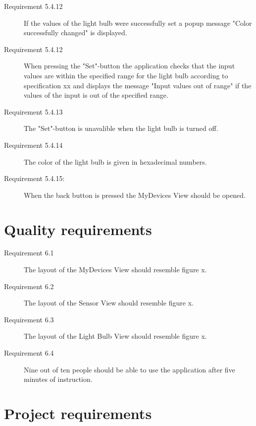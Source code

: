 \documentclass[a4paper]{article}
\begin{document}
\begin{description}
\item[Requirement 5.4.12] If the values of the light bulb were successfully set a popup message "Color successfully changed" is displayed.

\item[Requirement 5.4.12] When pressing the "Set"-button the application checks that the input values are within the specified range for the light bulb according to specification xx and displays the message "Input values out of range" if the values of the input is out of the specified range.

\item[Requirement 5.4.13] The "Set"-button is unavalible when the light bulb is turned off.

\item[Requirement 5.4.14] The color of the light bulb is given in hexadecimal numbers.

\item[Requirement 5.4.15:] When the back button is pressed the MyDevices View should be opened.

\end{description}

\section{Quality requirements}

\begin{description}
\item[Requirement 6.1] The layout of the MyDevices View should resemble figure x.
\item[Requirement 6.2] The layout of the Sensor View should resemble figure x.
\item[Requirement 6.3] The layout of the Light Bulb View should resemble figure x.
\item[Requirement 6.4] Nine out of ten people should be able to use the application after five minutes of instruction. 

\end{description}


\section{Project requirements}
\end{document}
